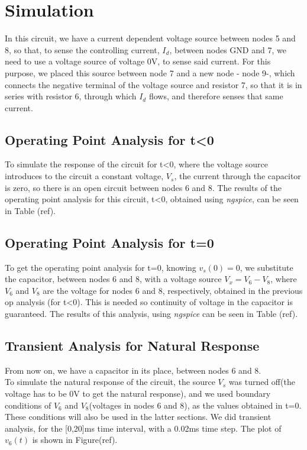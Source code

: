 \section{Simulation}
\label{sec:simulation}
In this circuit, we have a current dependent voltage source between nodes 5 and 8, so that, to sense the controlling current, $I_d$, between nodes GND and 7, we need to use a voltage source of voltage 0V, to sense said current. For this purpose, we placed this source between node 7 and a new node - node 9-, which connects the negative terminal of the voltage source and resistor 7, so that it is in series with resistor 6, through which $I_d$ flows, and therefore senses that same current.\\
\subsection{Operating Point Analysis for t\textless0}
To simulate the response of the circuit for t\textless0, where the voltage source introduces to the circuit a constant voltage, $V_s$, the current through the capacitor is zero, so there is an open circuit between nodes 6 and 8. The results of the operating point analysis for this circuit, t\textless0, obtained using \textit{ngspice}, can be seen in Table (ref).\\

\subsection{Operating Point Analysis for t=0}
To get the operating point analysis for t=0, knowing $v_s(0)=0$, we substitute the capacitor, between nodes 6 and 8, with a voltage source $V_x=V_6-V_8$, where $V_6$ and $V_8$ are the voltage for nodes 6 and 8, respectively, obtained in the previous op analysis (for t\textless0). This is needed so continuity of voltage in the capacitor is guaranteed. The results of this analysis, using \textit{ngspice} can be seen in Table (ref).\\
\subsection{Transient Analysis for Natural Response}
From now on, we have a capacitor in its place, between nodes 6 and 8.\\
To simulate the natural response of the circuit, the source $V_s$ was turned off(the voltage has to be 0V to get the natural response), and we used boundary conditions of $V_6$ and $V_8$(voltages in nodes 6 and 8), as the values obtained in t=0. These conditions will also be used in the latter sections. We did transient analysis, for the [0,20]ms time interval, with a 0.02ms time step. The plot of $v_{6}(t)$ is shown in Figure(ref).\\

